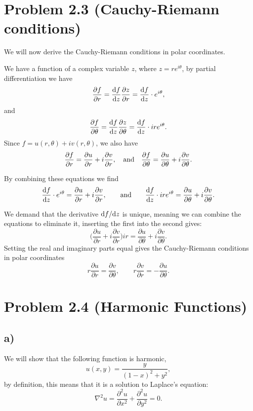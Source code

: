 \documentclass[a4paper, 11pt, titlepage, english]{article}
\renewcommand{\d}{{\rm d}}
\begin{document}
\section*{Problem 2.3 (Cauchy-Riemann conditions)}
We will now derive the Cauchy-Riemann conditions in polar coordinates.

We have a function of a complex variable $z$, where $z= re^{i\theta}$, by partial differentiation we have
$$\frac{\partial f}{\partial r} = \frac{\d f}{\d z} \frac{\partial z}{\partial r} = \frac{\d f}{\d z}\cdot e^{i\theta},$$
and
$$\frac{\partial f}{\partial \theta} = \frac{\d f}{\d z} \frac{\partial z}{\partial \theta} = \frac{\d f}{\d z}\cdot ire^{i\theta}.$$
Since $f = u(r,\theta) + iv(r,\theta)$, we also have
$$\frac{\partial f}{\partial r} = \frac{\partial u}{\partial r} + i\frac{\partial v}{\partial r}, \quad {\rm and} \quad \frac{\partial f}{\partial \theta} = \frac{\partial u}{\partial \theta} + i\frac{\partial v}{\partial \theta}.$$

By combining these equations we find
$$\frac{\d f}{\d z}\cdot e^{i\theta} = \frac{\partial u}{\partial r} + i\frac{\partial v}{\partial r}, \qquad {\rm and}\qquad \frac{\d f}{\d z}\cdot ire^{i\theta} = \frac{\partial u}{\partial \theta} + i\frac{\partial v}{\partial \theta}.$$

We demand that the derivative $\d f/\d z$ is unique, meaning we can combine the equations to eliminate it, inserting the first into the second gives:
$$\bigg(\frac{\partial u}{\partial r} + i\frac{\partial v}{\partial r}\bigg)ir = \frac{\partial u}{\partial \theta} + i\frac{\partial v}{\partial \theta}.$$
Setting the real and imaginary parts equal gives the Cauchy-Riemann conditions in polar coordinates
$$r\frac{\partial u}{\partial r} = \frac{\partial v}{\partial \theta}, \qquad r\frac{\partial v}{\partial r} = -\frac{\partial u}{\partial \theta}.$$

\clearpage

\section*{Problem 2.4 (Harmonic Functions)}
\subsection*{a)}
We will show that the following function is harmonic,
$$u(x,y) = \frac{y}{(1-x)^2 + y^2},$$
by definition, this means that it is a solution to Laplace's equation:
$$\nabla^2 u = \frac{\partial^2 u}{\partial x^2} + \frac{\partial^2 u}{\partial y^2} = 0.$$
\end{document}
